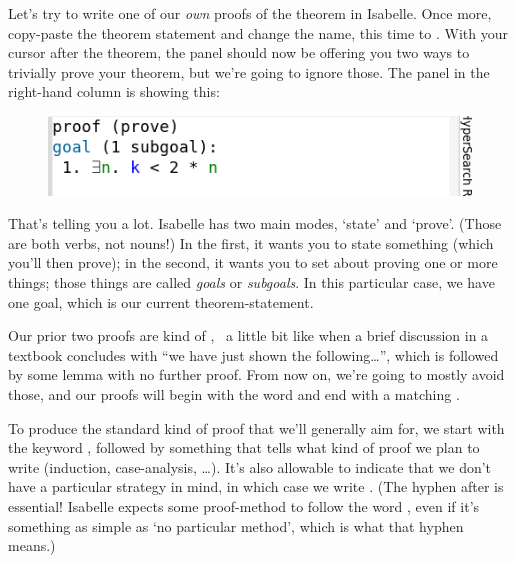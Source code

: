 
Let's try to write one of our \textit{own} proofs of the theorem in Isabelle. Once more, copy-paste the theorem statement and change the name, this time to . With your cursor after the theorem, the  panel should now be offering you two ways to trivially prove your theorem, but we're going to ignore those. The  panel in the right-hand column is showing this:
\begin{figure}[h]
    \includegraphics[width=0.75\linewidth]{C01/Images/state-panel.png}
\end{figure}

That's telling you a lot. Isabelle has two main modes, `state' and `prove'. (Those are both verbs, not nouns!) In the first, it wants you to state something (which you'll then prove); in the second, it wants you to set about proving one or more things; those things are called \textit{goals} or \textit{subgoals}. In this particular case, we have one goal, which is our current theorem-statement. 

Our prior two proofs are kind of ,  a little bit like when a brief discussion in a textbook concludes with ``we have just shown the following…'', which is followed by some lemma with no further proof. From now on, we're going to mostly avoid those, and our proofs will begin with the word  and end with a matching . 

To produce the standard kind of proof that we'll generally aim for, we start with the keyword , followed by something that tells what kind of proof we plan to write (induction, case-analysis, \ldots ). It's also allowable to indicate that we don't have a particular strategy in mind, in which case we write . (The hyphen after  is essential! Isabelle expects some proof-method to follow the word , even if it's something as simple as `no particular method', which is what that hyphen means.)


